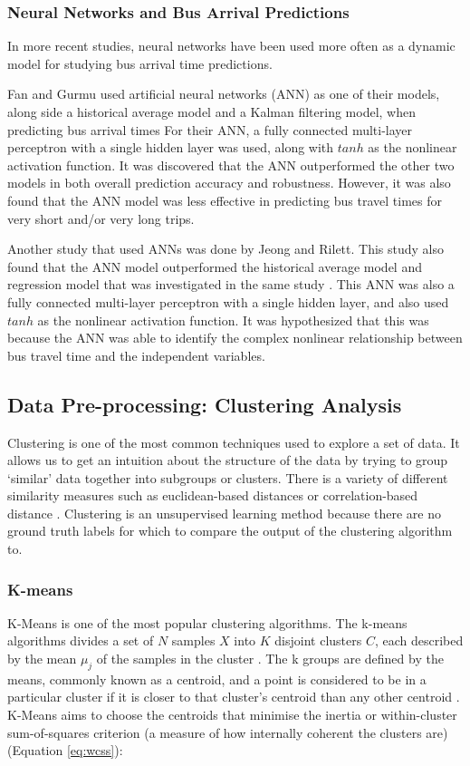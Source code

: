 \documentclass[12pt, a4paper]{article}
\begin{document}
\subsubsection{Neural Networks and Bus Arrival Predictions}

In more recent studies, neural networks have been used more often as a dynamic model for studying bus arrival time predictions. 

Fan and Gurmu used artificial neural networks (ANN) as one of their models, along side a historical average model and a Kalman filtering model, when predicting bus arrival times \cite{dynamic-gps}  For their ANN, a fully connected multi-layer perceptron with a single hidden layer was used, along with $tanh$ as the nonlinear activation function. It was discovered that the ANN outperformed the other two models in both overall prediction accuracy and robustness. However, it was also found that the ANN model was less effective in predicting bus travel times for very short and/or very long trips.

Another study that used ANNs was done by Jeong and Rilett. This study also found that the ANN model outperformed the historical average model and regression model that was investigated in the same study \cite{ann-prediction}. This ANN was also a fully connected multi-layer perceptron with a single hidden layer, and also used $tanh$ as the nonlinear activation function. It was hypothesized that this was because the ANN was able to identify the complex nonlinear relationship between bus travel time and the independent variables. 

\subsection{Data Pre-processing: Clustering Analysis}

Clustering is one of the most common techniques used to explore a set of data. It allows us to get an intuition about the structure of the data by trying to group `similar' data together into subgroups or clusters. There is a variety of different similarity measures such as euclidean-based distances or correlation-based distance \cite{k-means-towards-ds}. Clustering is an unsupervised learning method because there are no ground truth labels for which to compare the output of the clustering algorithm to.

\subsubsection{K-means}
K-Means is one of the most popular clustering algorithms. The k-means algorithms divides a set of $N$ samples $X$ into $K$ disjoint clusters $C$, each described by the mean $\mu_j$ of the samples in the cluster \cite{k-means-sklearn}. The k groups are defined by the means, commonly known as a centroid, and a point is considered to be in a particular cluster if it is closer to that cluster's centroid than any other centroid \cite{k-means-stanford-notes}. K-Means aims to choose the centroids that minimise the inertia or within-cluster sum-of-squares criterion (a measure of how internally coherent the clusters are) (Equation \ref{eq:wcss}): 
\end{document}
